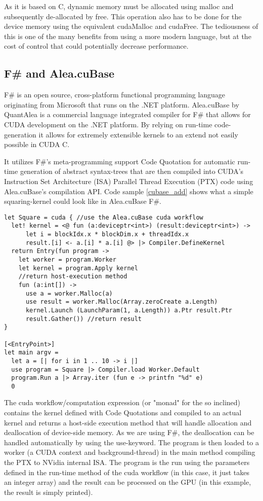 As it is based on C, dynamic memory must be allocated using malloc and subsequently de-allocated by free.
This operation also has to be done for the device memory using the equivalent cudaMalloc and cudaFree.
The tediousness of this is one of the many benefits from using a more modern language, but at the cost of control that could potentially decrease performance.

\subsection{F\# and Alea.cuBase}
F\#\cite{fsharp} is an open source, cross-platform functional programming language originating from Microsoft that runs on the .NET platform.
Alea.cuBase by QuantAlea\cite{quantalea} is a commercial language integrated compiler for F\# that allows for CUDA development on the .NET platform.
By relying on run-time code-generation it allows for extremely extensible kernels to an extend not easily possible in CUDA C.

It utilizes F\#'s meta-programming support Code Quotation\cite{ms:quotations} for automatic run-time generation of abstract syntax-trees that are then compiled into CUDA's Instruction Set Architecture (ISA) Parallel Thread Execution (PTX) code using Alea.cuBase's compilation API.
Code sample \ref{cubase_add} shows what a simple squaring-kernel could look like in Alea.cuBase F\#. 

\begin{lstlisting}[caption=Alea.cuBase square kernel, label=cubase_add]
let Square = cuda { //use the Alea.cuBase cuda workflow
  let! kernel = <@ fun (a:deviceptr<int>) (result:deviceptr<int>) ->
      let i = blockIdx.x * blockDim.x + threadIdx.x
      result.[i] <- a.[i] * a.[i] @> |> Compiler.DefineKernel
  return Entry(fun program ->
    let worker = program.Worker
    let kernel = program.Apply kernel
    //return host-execution method
    fun (a:int[]) ->
      use a = worker.Malloc(a)
      use result = worker.Malloc(Array.zeroCreate a.Length)
      kernel.Launch (LaunchParam(1, a.Length)) a.Ptr result.Ptr
      result.Gather()) //return result
}

[<EntryPoint>]
let main argv = 
  let a = [| for i in 1 .. 10 -> i |]
  use program = Square |> Compiler.load Worker.Default
  program.Run a |> Array.iter (fun e -> printfn "%d" e)
  0
\end{lstlisting}

The cuda workflow/computation expression (or "monad" for the so inclined) contains the kernel defined with Code Quotations and compiled to an actual kernel and returns a host-side execution method that will handle allocation and deallocation of device-side memory. 
As we are using F\#, the deallocation can be handled automatically by using the use-keyword. 
The program is then loaded to a worker (a CUDA context and background-thread) in the main method compiling the PTX to NVidia internal ISA.
The program is the run using the parameters defined in the run-time method of the cuda workflow (in this case, it just takes an integer array) and the result can be processed on the GPU (in this example, the result is simply printed).